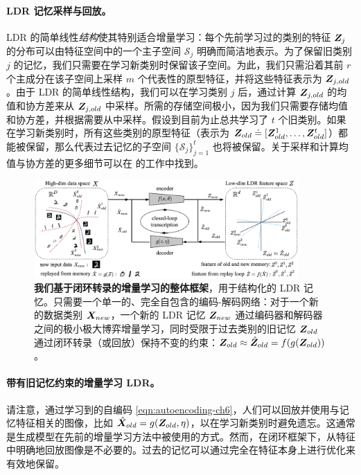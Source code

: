 \documentclass[../../book-main.tex]{subfiles}
\begin{document}
\paragraph{LDR 记忆采样与回放。} LDR 的简单线性{\em 结构}使其特别适合增量学习：每个先前学习过的类别的特征 $\bm{Z}_j$ 的分布可以由特征空间中的一个主子空间 $\mathcal{S}_j$ 明确而简洁地表示。为了保留旧类别 $j$ 的记忆，我们只需要在学习新类别时保留该子空间。为此，我们只需沿着其前 $r$ 个主成分在该子空间上采样 $m$ 个代表性的原型特征，并将这些特征表示为 $\bm{Z}_{j,old}$。由于 LDR 的简单线性结构，我们可以在学习类别 $j$ 后，通过计算 $\bm{Z}_{j,old}$ 的均值和协方差来从 $\bm{Z}_{j,old}$ 中采样。所需的存储空间极小，因为我们只需要存储均值和协方差，并根据需要从中采样。假设到目前为止总共学习了 $t$ 个旧类别。如果在学习新类别时，所有这些类别的原型特征（表示为 $\bm{Z}_{old} \doteq [\bm{Z}^1_{old},\ldots, \bm{Z}^t_{old}]$）都能被保留，那么代表过去记忆的子空间 $\{\mathcal{S}_j\}_{j=1}^t$ 也将被保留。关于采样和计算均值与协方差的更多细节可以在 \cite{tong2023incremental} 的工作中找到。

\begin{figure}[t]
\centering
\includegraphics[width=0.9\textwidth]{figs_chap6/framework-v7.png}
\caption{\textbf{我们基于闭环转录的增量学习的整体框架}，用于结构化的 LDR 记忆。只需要一个单一的、完全自包含的编码-解码网络：对于一个新的数据类别 $\bm{X}_{new}$，一个新的 LDR 记忆 $\bm{Z}_{new}$ 通过编码器和解码器之间的极小极大博弈增量学习，同时受限于过去类别的旧记忆 $\bm{Z}_{old}$ 通过闭环转录（或回放）保持不变的约束：$\bm{Z}_{old} \approx \hat{\bm{Z}}_{old} = f(g(\bm{Z}_{old}))$。
\vspace{-0.2in}}
\label{fig:framework}
\end{figure}

\paragraph{带有旧记忆约束的增量学习 LDR。} 
请注意，通过学习到的自编码 \eqref{eqn:autoencoding-ch6}，人们可以回放并使用与记忆特征相关的图像，比如 $\hat{\bm{X}}_{old} = g(\bm{Z}_{old}, \eta)$，以在学习新类别时避免遗忘。这通常是生成模型在先前的增量学习方法中被使用的方式。然而，在闭环框架下，从特征中明确地回放图像是不必要的。过去的记忆可以通过完全在特征本身上进行优化来有效地保留。
\end{document}
